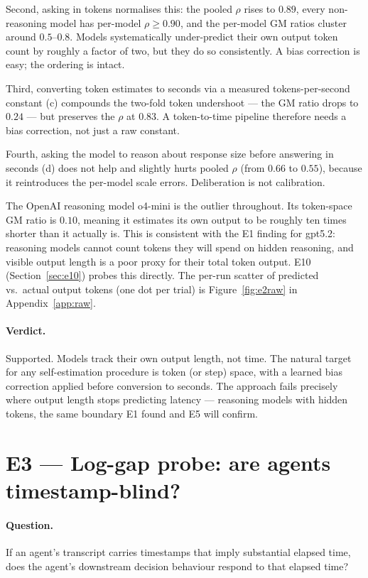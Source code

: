 \documentclass[11pt]{article}
\begin{document}
Second, asking in tokens normalises this: the pooled $\rho$ rises to $0.89$, every
non-reasoning model has per-model $\rho \geq 0.90$, and the per-model GM ratios cluster
around $0.5$--$0.8$. Models systematically under-predict their own output token count by
roughly a factor of two, but they do so consistently. A bias correction is easy; the
ordering is intact.

Third, converting token estimates to seconds via a measured tokens-per-second constant (c)
compounds the two-fold token undershoot --- the GM ratio drops to $0.24$ --- but preserves the
$\rho$ at $0.83$. A token-to-time pipeline therefore needs a bias correction, not just a raw
constant.

Fourth, asking the model to reason about response size before answering in seconds (d) does
not help and slightly hurts pooled $\rho$ (from $0.66$ to $0.55$), because it reintroduces the
per-model scale errors. Deliberation is not calibration.

The OpenAI reasoning model o4-mini is the outlier throughout. Its token-space GM ratio is
$0.10$, meaning it estimates its own output to be roughly ten times shorter than it actually
is. This is consistent with the E1 finding for gpt5.2: reasoning models cannot count tokens
they will spend on hidden reasoning, and visible output length is a poor proxy for their
total token output. E10 (Section~\ref{sec:e10}) probes this directly. The per-run scatter of
predicted vs.\ actual output tokens (one dot per trial) is Figure~\ref{fig:e2raw} in
Appendix~\ref{app:raw}.

\paragraph{Verdict.} Supported. Models track their own output length, not time. The natural
target for any self-estimation procedure is token (or step) space, with a learned bias
correction applied before conversion to seconds. The approach fails precisely where output
length stops predicting latency --- reasoning models with hidden tokens, the same boundary
E1 found and E5 will confirm.

\section{E3 --- Log-gap probe: are agents timestamp-blind?}
\label{sec:e3}

\paragraph{Question.} If an agent's transcript carries timestamps that imply substantial
elapsed time, does the agent's downstream decision behaviour respond to that elapsed time?
\end{document}
